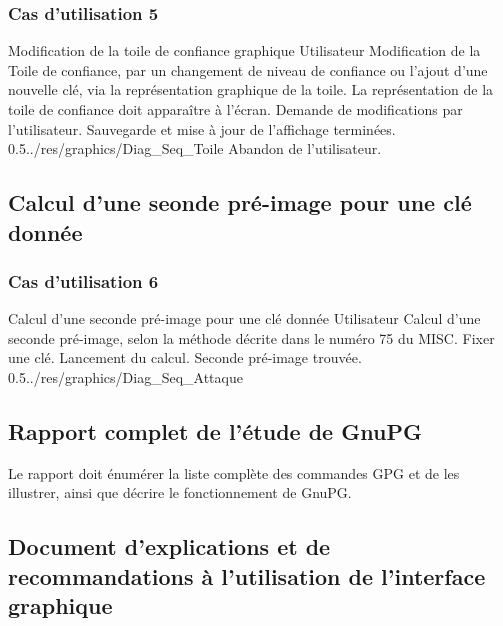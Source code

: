 \documentclass{../res/univ-projet}
\begin{document}
\subsubsection{Cas d'utilisation 5}
\ficheGraphic
{Modification de la toile de confiance graphique}         
{Utilisateur}
{Modification de la Toile de confiance, par un changement de niveau de confiance ou l'ajout d'une nouvelle clé, via la représentation graphique de la toile.}
{La représentation de la toile de confiance doit apparaître à l'écran.}
{Demande de modifications par l'utilisateur.}
{Sauvegarde et mise à jour de l'affichage terminées.}
{0.5}{../res/graphics/Diag_Seq_Toile}
{Abandon de l'utilisateur.}                      
\vspace{0.5cm}
  

\subsection{Calcul d'une seonde pré-image pour une clé donnée}
  
\subsubsection{Cas d'utilisation 6}
\ficheGraphic
{Calcul d'une seconde pré-image pour une clé donnée}
{Utilisateur}
{Calcul d'une seconde pré-image, selon la méthode décrite dans le numéro 75 du MISC.}
{Fixer une clé.}
{Lancement du calcul.}
{Seconde pré-image trouvée.}
{0.5}{../res/graphics/Diag_Seq_Attaque}
{}
\vspace{0.5cm}


\subsection{Rapport complet de l'étude de GnuPG}

Le rapport doit énumérer la liste complète des commandes GPG et de les illustrer, ainsi que décrire le fonctionnement de GnuPG.


\subsection{Document d'explications et de recommandations à l'utilisation de l'interface graphique}
\end{document}
